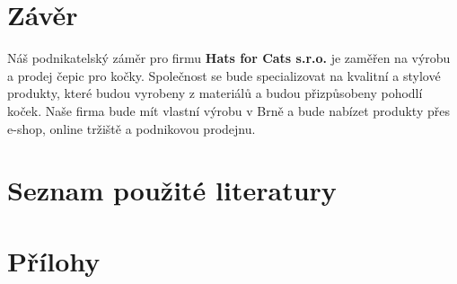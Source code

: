 \documentclass[12pt, a4paper]{article}
\begin{document}
\section{Závěr}

Náš podnikatelský záměr pro firmu \textbf{Hats for Cats s.r.o.} je zaměřen na výrobu a prodej čepic pro kočky.
Společnost se bude specializovat na kvalitní a stylové produkty, které budou vyrobeny z materiálů a budou přizpůsobeny pohodlí koček.
Naše firma bude mít vlastní výrobu v Brně a bude nabízet produkty přes e-shop, online tržiště a podnikovou prodejnu.

\section{Seznam použité literatury}
\printbibliography[heading=none]
\section{Přílohy}

\listoftables
\end{document}
